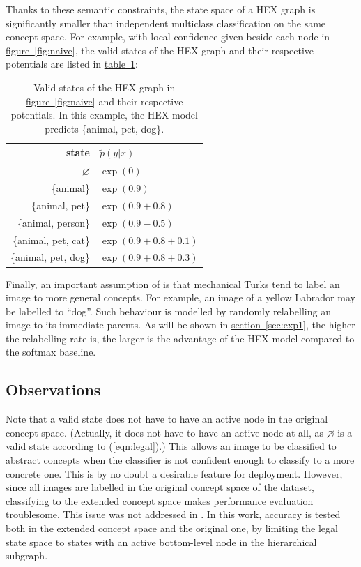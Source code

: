 \documentclass[11pt,a4paper]{article}
\begin{document}
Thanks to these semantic constraints, the state space of a HEX graph is significantly smaller than independent multiclass classification on the same concept space. For example, with local confidence given beside each node in \hyperref[fig:naive]{figure~\ref{fig:naive}}, the valid states of the HEX graph and their respective potentials are listed in \hyperref[tab:naive]{table~\ref{tab:naive}}:

\begin{table}[htbp]
\centering
\begin{tabular}{r|l}
state & $\tilde{p}(y|x)$\\
\hline
$\varnothing$ & $\exp(0)$\\
\{animal\} & $\exp(0.9)$\\
\{animal, pet\} & $\exp(0.9+0.8)$\\
\{animal, person\} & $\exp(0.9-0.5)$\\
\{animal, pet, cat\} & $\exp(0.9+0.8+0.1)$\\
\{animal, pet, dog\} & $\exp(0.9+0.8+0.3)$
\end{tabular}
\caption{Valid states of the HEX graph in \hyperref[fig:naive]{figure~\ref{fig:naive}} and their respective potentials. In this example, the HEX model predicts \{animal, pet, dog\}.}
\label{tab:naive}
\end{table}

Finally, an important assumption of \cite{deng2014large} is that mechanical Turks tend to label an image to more general concepts. For example, an image of a yellow Labrador may be labelled to ``dog''. Such behaviour is modelled by randomly relabelling an image to its immediate parents. As will be shown in \hyperref[sec:exp1]{section~\ref{sec:exp1}}, the higher the relabelling rate is, the larger is the advantage of the HEX model compared to the softmax baseline.

\subsection{Observations}
\label{sec:observ}

Note that a valid state does not have to have an active node in the original concept space. (Actually, it does not have to have an active node at all, as $\varnothing$ is a valid state according to \hyperref[eqn:legal]{(\ref{eqn:legal})}.) This allows an image to be classified to abstract concepts when the classifier is not confident enough to classify to a more concrete one. This is by no doubt a desirable feature for deployment. However, since all images are labelled in the original concept space of the dataset, classifying to the extended concept space makes performance evaluation troublesome. This issue was not addressed in \cite{deng2014large}. In this work, accuracy is tested both in the extended concept space and the original one, by limiting the legal state space to states with an active bottom-level node in the hierarchical subgraph.
\end{document}

